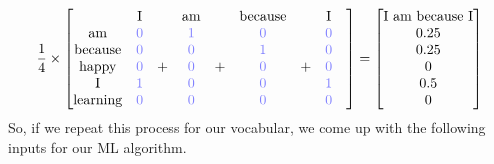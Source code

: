 \documentclass[12pt]{article}
\begin{document}
\begin{equation*}
  \frac{1}{4} \times 
  \begin{bmatrix}
    & \textrm{I} & & \textrm{am} & & \textrm{because} & & \textrm{I} & \\
    \textrm{am} & {\color{blue!50} 0} & & {\color{blue!50}1} & & {\color{blue!50}0} & & {\color{blue!50}0} & \\
    \textrm{because} & {\color{blue!50}0} & & {\color{blue!50}0} & & {\color{blue!50}1} & & {\color{blue!50}0} & \\
    \textrm{happy} & {\color{blue!50}0} & + & {\color{blue!50}0} & + & {\color{blue!50}0} & + & {\color{blue!50}0} \\
    \textrm{I} & {\color{blue!50}1} & & {\color{blue!50}0} & & {\color{blue!50}0} & & {\color{blue!50}1} & \\
    \textrm{learning} & {\color{blue!50}0} & & {\color{blue!50}0} & & {\color{blue!50}0} & & {\color{blue!50}0} &
\end{bmatrix}
= \begin{bmatrix} \textrm{I am because I} \\
  0.25 \\
  0.25 \\
  0 \\
  0.5 \\
  0
\end{bmatrix}
\end{equation*}
So, if we repeat this process for our vocabular, we come up with the following inputs for our ML algorithm.
\end{document}
